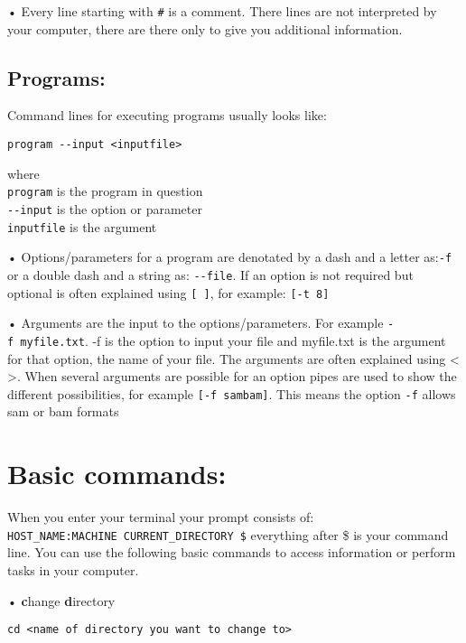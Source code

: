 \documentclass[
]{book}
\begin{document}
• Every line starting with \texttt{\#} is a comment. There lines are not interpreted by your computer, there are there only to give you additional information.

\hypertarget{programs}{%
\subsection{Programs:}\label{programs}}

Command lines for executing programs usually looks like:

\begin{verbatim}
program --input <inputfile>
\end{verbatim}

where\\
\texttt{program} is the program in question\\
\texttt{-\/-input} is the option or parameter\\
\texttt{inputfile} is the argument

• Options/parameters for a program are denotated by a dash and a letter as:\texttt{-f} or a double dash and a string as: \texttt{-\/-file}. If an option is not required but optional is often explained using \texttt{{[}\ {]}}, for example: \texttt{{[}-t\ 8{]}}

• Arguments are the input to the options/parameters. For example \texttt{-f\ myfile.txt}. -f is the option to input your file and myfile.txt is the argument for that option, the name of your file. The arguments are often explained using \textless{} \textgreater. When several arguments are possible for an option pipes are used to show the different possibilities, for example \texttt{{[}-f\ sam\textbar{}bam{]}}. This means the option \texttt{-f} allows sam or bam formats

\hypertarget{basic-commands}{%
\section{Basic commands:}\label{basic-commands}}

When you enter your terminal your prompt consists of: \texttt{HOST\_NAME:MACHINE\ CURRENT\_DIRECTORY\ \$} everything after \$ is your command line. You can use the following basic commands to access information or perform tasks in your computer.

• \textbf{c}hange \textbf{d}irectory

\begin{verbatim}
cd <name of directory you want to change to>
\end{verbatim}
\end{document}

